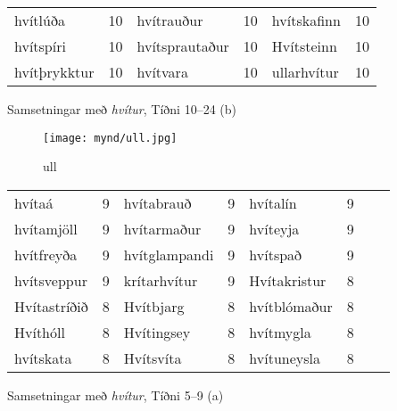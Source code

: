 \documentclass{../litmal.tex}{subfiles}
\begin{document}
\begin{wordlist}[H]
\begin{tcolorbox}

	\setlength{\extrarowheight}{3pt}
	\begin{tabular}{BlBlBl}		
		hvítlúða		& 10		& 
		hvítrauður	& 10		& 
		hvítskafinn	& 10		\\ 	
		hvítspíri		& 10		& 
		hvítsprautaður & 10		& 
		Hvítsteinn	& 10		\\ 
		hvítþrykktur	& 10		& 
		hvítvara		& 10		& 
		ullarhvítur	& 10		 
	\end{tabular}
	
\end{tcolorbox}
	\caption{Samsetningar með \textit{hvítur}, Tíðni 10--24 (b)}
	\label{listi:hvitt.10b}
\end{wordlist}

\begin{figure}[H]
\begin{tcolorbox}
\centering
	\texttt{[image: mynd/ull.jpg]}
\end{tcolorbox}
	\caption{ull}
	\label{mynd:ull}
\end{figure}

\begin{wordlist}[H]
\begin{tcolorbox}

	\setlength{\extrarowheight}{3pt}
	\begin{tabular}{BlBlBlBl}
		hvítaá		& 9		& 	
		hvítabrauð	& 9		& 		
		hvítalín		& 9		\\ 	%
		hvítamjöll		& 9		& 
		hvítarmaður	& 9		& 	
		hvíteyja		& 9		\\  %
		hvítfreyða	& 9		& 
		hvítglampandi 	& 9		& 	
		hvítspað		& 9		\\  %
		hvítsveppur	& 9		& 	
		krítarhvítur	& 9		& 	
		Hvítakristur	& 8		\\ 	%
		Hvítastríðið	& 8		& 	
		Hvítbjarg		& 8		& 
		hvítblómaður	 & 8		\\  %
		Hvíthóll		& 8		& 
		Hvítingsey	& 8		& 
		hvítmygla		& 8		\\  %
		hvítskata		& 8		& 
		Hvítsvíta		& 8		&  
		hvítuneysla	& 8		 	%
	\end{tabular}
	
\end{tcolorbox}
	\caption{Samsetningar með \textit{hvítur}, Tíðni 5--9 (a)}
	\label{listi:hvitt.5a}
\end{wordlist}	
\end{document}
